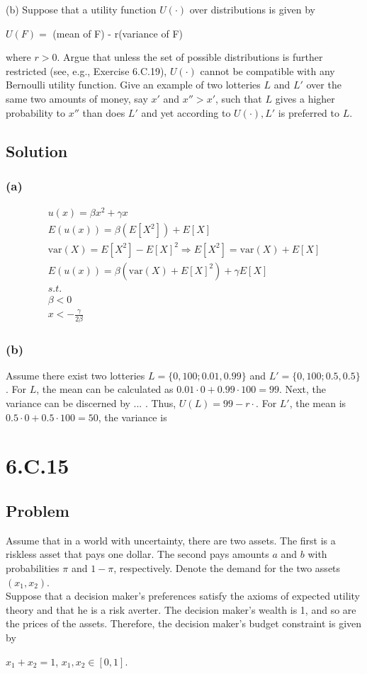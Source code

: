 \documentclass[10pt, a4paper]{article}
\newcommand{\var}{\text{var}}
\begin{document}
      (b) Suppose that a utility function $U(\cdot)$ over distributions is given by 
      \begin{center}
        $U(F) = $ (mean of F) - r(variance of F)
      \end{center}
      where $r>0$. Argue that unless the set of possible distributions is further restricted (see, e.g., Exercise 6.C.19), $U(\cdot)$ cannot be compatible with any Bernoulli utility function. Give an example of two lotteries $L$ and $L'$ over the same two amounts of money, say $x'$ and $x''>x'$, such that $L$ gives a higher probability to $x''$ than does $L'$ and yet according to $U(\cdot), L'$ is preferred to $L$. 
    \subsection*{Solution}
      \subsubsection*{(a)}
        \begin{gather*}
          u(x) = \beta x^2 + \gamma x\\
          E(u(x)) = \beta(E[X^2]) + E[X]\\
          \var(X) = E[X^2] - E[X]^2 \Rightarrow E[X^2] = \var(X) + E[X]\\
          E(u(x)) = \beta(\var(X)+E[X]^2) + \gamma E[X] \\
          s.t. \\
          \beta<0\\
          x < -\frac{\gamma}{2\beta} 
        \end{gather*}
      \subsubsection*{(b)}
        Assume there exist two lotteries $L = \{0, 100; 0.01, 0.99\}$ and $L' = \{0, 100; 0.5, 0.5\}$. For $L$, the mean can be calculated as $0.01\cdot0 + 0.99\cdot100 = 99$. Next, the variance can be discerned by ... . Thus, $U(L) = 99 - r\cdot$. For $L'$, the mean is $0.5\cdot 0 + 0.5\cdot100 = 50$, the variance is 
  \section*{6.C.15}
    \subsection*{Problem}
      Assume that in a world with uncertainty, there are two assets. The first is a riskless asset that pays one dollar. The second pays amounts $a$ and $b$ with probabilities $\pi$ and $1-\pi$, respectively. Denote the demand for the two assets $(x_1,x_2)$. \\
      Suppose that a decision maker's preferences satisfy the axioms of expected utility theory and that he is a risk averter. The decision maker's wealth is 1, and so are the prices of the assets. Therefore, the decision maker's budget constraint is given by 
      \begin{center}
        $x_1+x_2=1$, $x_1,x_2\in[0,1]$.
      \end{center}
\end{document}
